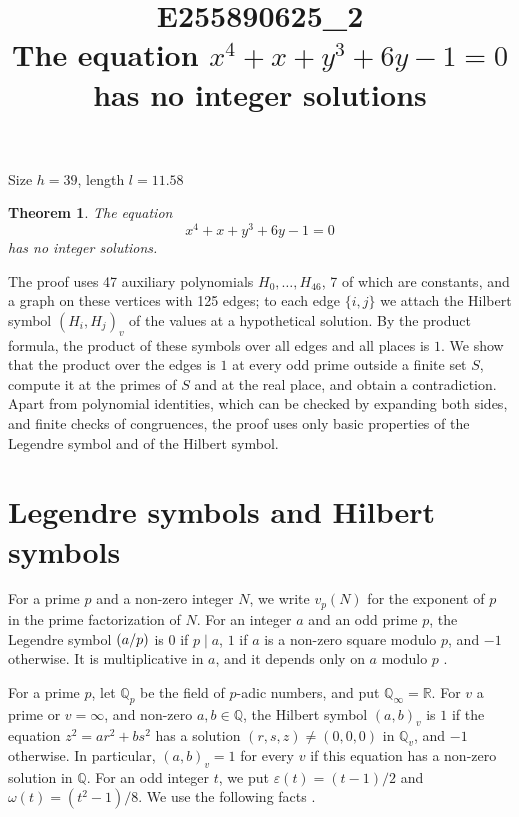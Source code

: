 \documentclass[11pt]{article}
\title{\textbf{E255890625\_2}\\[4pt] {\Large The equation $x^{4}+x+y^{3}+6y-1=0$ has no integer solutions}}
\author{}
\date{}
\newtheorem{theorem}{Theorem}
\newcommand{\Q}{\mathbb{Q}}
\newcommand{\leg}[2]{\mathchoice{\biggl(\dfrac{#1}{#2}\biggr)}{(#1/#2)}{(#1/#2)}{(#1/#2)}}
\begin{document}
\maketitle
\vspace{-8ex}
\begin{center}
Size $h=39$, length $l=11.58$
\end{center}

\begin{theorem}\label{thm:main}
The equation
\begin{equation}\label{eq:main}
x^{4}+x+y^{3}+6y-1=0
\end{equation}
has no integer solutions.
\end{theorem}

The proof uses 47 auxiliary polynomials $H_0,\dots,H_{46}$, 7 of which are constants, and a graph on these vertices with 125 edges; to each edge $\{i,j\}$ we attach the Hilbert symbol $(H_i,H_j)_v$ of the values at a hypothetical solution. By the product formula, the product of these symbols over all edges and all places is $1$. We show that the product over the edges is $1$ at every odd prime outside a finite set $S$, compute it at the primes of $S$ and at the real place, and obtain a contradiction. Apart from polynomial identities, which can be checked by expanding both sides, and finite checks of congruences, the proof uses only basic properties of the Legendre symbol and of the Hilbert symbol.

\section{Legendre symbols and Hilbert symbols}

For a prime $p$ and a non-zero integer $N$, we write $v_p(N)$ for the exponent of $p$ in the prime factorization of $N$. For an integer $a$ and an odd prime $p$, the Legendre symbol $\leg{a}{p}$ is $0$ if $p\mid a$, $1$ if $a$ is a non-zero square modulo $p$, and $-1$ otherwise. It is multiplicative in $a$, and it depends only on $a$ modulo $p$ \cite[Chapter~5]{IR}.

For a prime $p$, let $\Q_p$ be the field of $p$-adic numbers, and put $\Q_\infty=\mathbb R$. For $v$ a prime or $v=\infty$, and non-zero $a,b\in\Q$, the Hilbert symbol $(a,b)_v$ is $1$ if the equation $z^2=ar^2+bs^2$ has a solution $(r,s,z)\neq(0,0,0)$ in $\Q_v$, and $-1$ otherwise. In particular, $(a,b)_v=1$ for every $v$ if this equation has a non-zero solution in $\Q$. For an odd integer $t$, we put $\varepsilon(t)=(t-1)/2$ and $\omega(t)=(t^2-1)/8$. We use the following facts \cite[Chapter~III, Proposition~2 and Theorems~1 and~3]{Se}.
\end{document}
